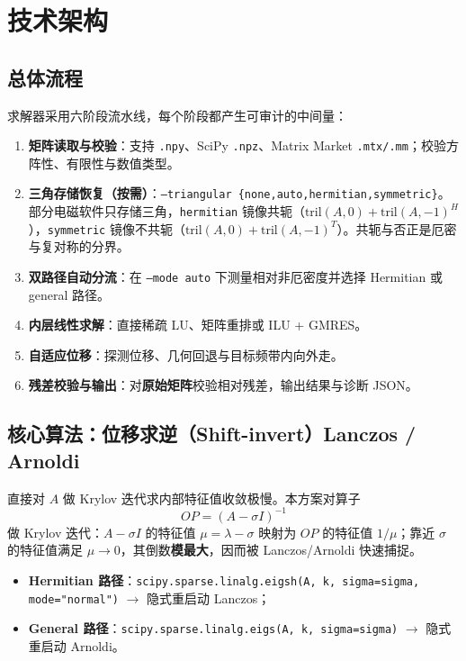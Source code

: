 \documentclass[11pt,a4paper]{ctexart}
\newcommand{\code}[1]{\texttt{\small #1}}
\begin{document}
\section{技术架构}

\subsection{总体流程}

求解器采用六阶段流水线，每个阶段都产生可审计的中间量：

\begin{enumerate}
  \item \textbf{矩阵读取与校验}：支持 \code{.npy}、SciPy \code{.npz}、Matrix Market \code{.mtx/.mm}；校验方阵性、有限性与数值类型。
  \item \textbf{三角存储恢复（按需）}：\code{--triangular \{none,auto,hermitian,symmetric\}}。部分电磁软件只存储三角，\code{hermitian} 镜像共轭（$\mathrm{tril}(A,0)+\mathrm{tril}(A,-1)^{H}$），\code{symmetric} 镜像不共轭（$\mathrm{tril}(A,0)+\mathrm{tril}(A,-1)^{T}$）。共轭与否正是厄密与复对称的分界。
  \item \textbf{双路径自动分流}：在 \code{--mode auto} 下测量相对非厄密度并选择 Hermitian 或 general 路径。
  \item \textbf{内层线性求解}：直接稀疏 LU、矩阵重排或 ILU + GMRES。
  \item \textbf{自适应位移}：探测位移、几何回退与目标频带内向外走。
  \item \textbf{残差校验与输出}：对\textbf{原始矩阵}校验相对残差，输出结果与诊断 JSON。
\end{enumerate}

\subsection{核心算法：位移求逆（Shift-invert）Lanczos / Arnoldi}

直接对 $A$ 做 Krylov 迭代求内部特征值收敛极慢。本方案对算子
\[
OP = (A - \sigma I)^{-1}
\]
做 Krylov 迭代：$A-\sigma I$ 的特征值 $\mu = \lambda - \sigma$ 映射为 $OP$ 的特征值 $1/\mu$；靠近 $\sigma$ 的特征值满足 $\mu \to 0$，其倒数\textbf{模最大}，因而被 Lanczos/Arnoldi 快速捕捉。

\begin{itemize}
  \item \textbf{Hermitian 路径}：\code{scipy.sparse.linalg.eigsh(A, k, sigma=sigma, mode="normal")} $\to$ 隐式重启动 Lanczos；
  \item \textbf{General 路径}：\code{scipy.sparse.linalg.eigs(A, k, sigma=sigma)} $\to$ 隐式重启动 Arnoldi。
\end{itemize}
\end{document}
